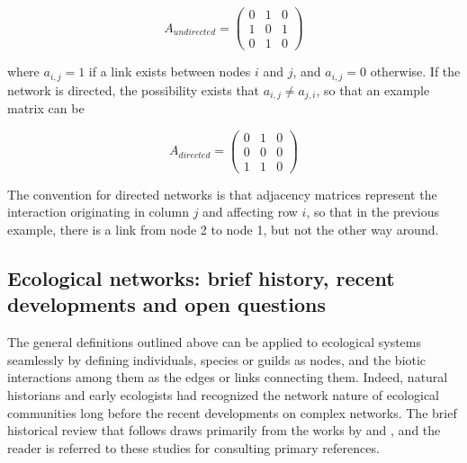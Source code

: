 \[
A_{undirected} = \begin{pmatrix}
0& 1& 0 \\
1& 0& 1 \\
0& 1& 0
\end{pmatrix}
\]

where $a_{i,j} = 1$ if a link exists between nodes $i$ and $j$, and $a_{i,j} = 0$ otherwise. If the network is directed, the possibility exists that $a_{i,j} \neq a_{j,i}$, so that an example matrix can be

\[
A_{directed} = \begin{pmatrix}
0& 1& 0 \\
0& 0& 0 \\
1& 1& 0
\end{pmatrix}
\]

The convention for directed networks is that adjacency matrices represent the interaction originating in column $j$ and affecting row $i$, so that in the previous example, there is a link from node 2 to node 1, but not the other way around. %

\subsection{Ecological networks: brief history, recent developments and open questions}

The general definitions outlined above can be applied to ecological systems seamlessly by defining individuals, species or guilds as nodes, and the biotic interactions among them as the edges or links connecting them. Indeed, natural historians and early ecologists had recognized the network nature of ecological communities long before the recent developments on complex networks. The brief historical review that follows draws primarily from the works by \cite{Bersier2007} and \cite{Ings2018}, and the reader is referred to these studies for consulting primary references.

